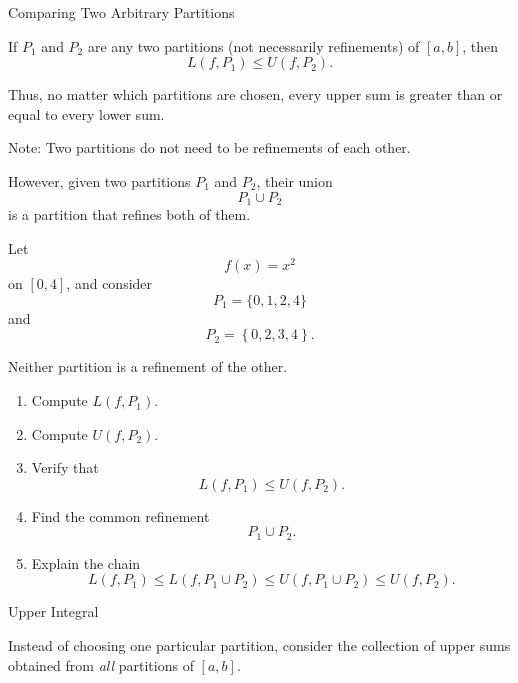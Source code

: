 \documentclass[12pt,a4paper]{article}
\begin{document}
\clearpage

\begin{heading}
Comparing Two Arbitrary Partitions
\end{heading}

\vspace{10pt}

\begin{theorem}
If $P_1$ and $P_2$ are any two partitions (not necessarily refinements) of $[a,b]$, then
\[
L(f,P_1)\le U(f,P_2).
\]
\end{theorem}

Thus, no matter which partitions are chosen, every upper sum is
greater than or equal to every lower sum.

Note: Two partitions do not need to be refinements of each other.

However, given two partitions $P_1$ and $P_2$, their union
\[
P_1\cup P_2
\]
is a partition that refines both of them.

\clearpage
\begin{problem}
Let
\[
f(x)=x^2
\]
on $[0,4]$, and consider
\[
P_1=\{0,1,2,4\}
\]
and
\[
P_2=
\left\{
0,2,3,4
\right\}.
\]

Neither partition is a refinement of the other.

\begin{enumerate}
    \item Compute $L(f,P_1)$.

    \item Compute $U(f,P_2)$.

    \item Verify that
    \[
    L(f,P_1)\le U(f,P_2).
    \]

    \item Find the common refinement
    \[
    P_1\cup P_2.
    \]

    \item Explain the chain
    \[
    L(f,P_1)
    \le
    L(f,P_1\cup P_2)
    \le
    U(f,P_1\cup P_2)
    \le
    U(f,P_2).
    \]
\end{enumerate}
\end{problem}

\clearpage

\begin{heading}
Upper Integral
\end{heading}

Instead of choosing one particular partition, consider the collection
of upper sums obtained from \emph{all} partitions of $[a,b]$.
\end{document}
